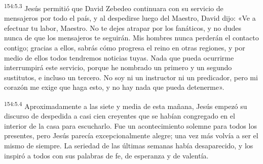\par
\textsuperscript{154:5.3} Jesús permitió que David Zebedeo continuara con su servicio de mensajeros por todo el país, y al despedirse luego del Maestro, David dijo: «Ve a efectuar tu labor, Maestro. No te dejes atrapar por los fanáticos, y no dudes nunca de que los mensajeros te seguirán. Mis hombres nunca perderán el contacto contigo; gracias a ellos, sabrás cómo progresa el reino en otras regiones, y por medio de ellos todos tendremos noticias tuyas. Nada que pueda ocurrirme interrumpirá este servicio, porque he nombrado un primero y un segundo sustitutos, e incluso un tercero. No soy ni un instructor ni un predicador, pero mi corazón me exige que haga esto, y no hay nada que pueda detenerme».

\par
\textsuperscript{154:5.4} Aproximadamente a las siete y media de esta mañana, Jesús empezó su discurso de despedida a casi cien creyentes que se habían congregado en el interior de la casa para escucharlo. Fue un acontecimiento solemne para todos los presentes, pero Jesús parecía excepcionalmente alegre; una vez más volvía a ser el mismo de siempre. La seriedad de las últimas semanas había desaparecido, y los inspiró a todos con sus palabras de fe, de esperanza y de valentía.

